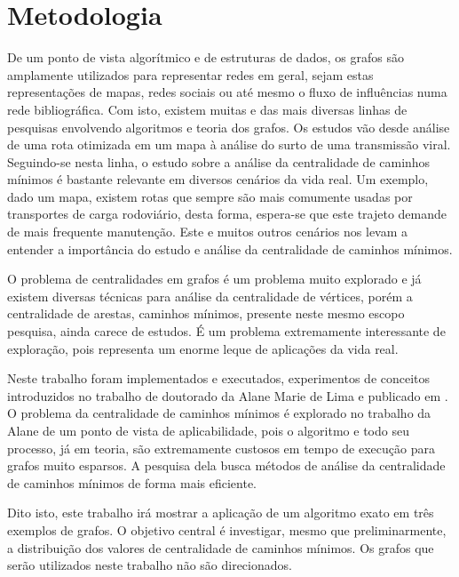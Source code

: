 \graphicspath{{\currfiledir/images/}}

\chapter{Metodologia}
De um ponto de vista algorítmico e de estruturas de dados, os grafos são amplamente utilizados para representar redes em geral, sejam estas representações de mapas, redes sociais ou até mesmo o fluxo de influências numa rede bibliográfica. Com isto, existem muitas e das mais diversas linhas de pesquisas envolvendo algoritmos e teoria dos grafos. Os estudos vão desde análise de uma rota otimizada em um mapa à análise do surto de uma transmissão viral. Seguindo-se nesta linha, o estudo sobre a análise da centralidade de caminhos mínimos é bastante relevante em diversos cenários da vida real. Um exemplo, dado um mapa, existem rotas que sempre são mais comumente usadas por transportes de carga rodoviário, desta forma, espera-se que este trajeto demande de mais frequente manutenção. Este e muitos outros cenários nos levam a entender a importância do estudo e análise da centralidade de caminhos mínimos.

O problema de centralidades em grafos é um problema muito explorado e já existem diversas técnicas para análise da centralidade de vértices, porém a centralidade de arestas, caminhos mínimos, presente neste mesmo escopo pesquisa, ainda carece de estudos. É um problema extremamente interessante de exploração, pois representa um enorme leque de aplicações da vida real.

Neste trabalho foram implementados e executados, experimentos de conceitos introduzidos no trabalho de doutorado da Alane Marie de Lima e publicado em \cite{alane2021}. O problema da centralidade de caminhos mínimos é explorado no trabalho da Alane de um ponto de vista de aplicabilidade, pois o algoritmo e todo seu processo, já em teoria, são extremamente custosos em tempo de execução para grafos muito esparsos. A pesquisa dela busca métodos de análise da centralidade de caminhos mínimos de forma mais eficiente.

Dito isto, este trabalho irá mostrar a aplicação de um algoritmo exato em três exemplos de grafos. O objetivo central é investigar, mesmo que preliminarmente, a distribuição dos valores de centralidade de caminhos mínimos. Os grafos que serão utilizados neste trabalho não são direcionados.

